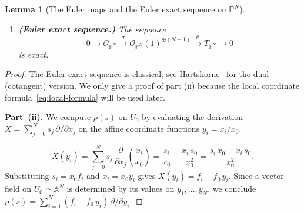 \documentclass[11pt,twoside]{amsart}
\theoremstyle{plain}
\numberwithin{equation}{section}
\newtheorem{lemma}[theorem]{Lemma}
\theoremstyle{definition}
\newcommand{\PP}{\mathbb{P}}
\newcommand{\OO}{\mathcal{O}}
\begin{document}
\begin{lemma}[The Euler maps and the Euler exact sequence on $\PP^N$]
\begin{enumerate}
\item[\textup{(iii)}] \textbf{(Euler exact sequence.)}
The sequence
\[
0\longrightarrow \OO_{\PP^N}
\xrightarrow{\ \sigma\ }
\OO_{\PP^N}(1)^{\oplus(N+1)}
\xrightarrow{\ \rho\ }
T_{\PP^N}
\longrightarrow 0
\]
is exact.
\end{enumerate}
\end{lemma}

\begin{proof}
The Euler exact sequence is classical; see Hartshorne~\cite[Theorem~II.8.13]{Hartshorne}
for the dual (cotangent) version.  We only give a proof of part (ii)  because the local coordinate formula~\eqref{eq:local-formula}
will be used later.


\noindent\textbf{Part~(ii).}
We compute $\rho(s)$ on $U_0$ by evaluating the derivation
$\widetilde{X}=\sum_{j=0}^N s_j\,\partial/\partial x_j$
on the affine coordinate functions $y_i=x_i/x_0$.

\[
\widetilde{X}(y_i)
=\sum_{j=0}^N s_j\,\frac{\partial}{\partial x_j}\!\left(\frac{x_i}{x_0}\right)
=\frac{s_i}{x_0}-\frac{x_i\, s_0}{x_0^2}
=\frac{s_i\, x_0-x_i\, s_0}{x_0^2}.
\]
Substituting $s_i=x_0 f_i$ and $x_i=x_0 y_i$ gives
$\widetilde{X}(y_i)=f_i-f_0\, y_i$.
Since a vector field on $U_0\simeq \mathbb{A}^N$ is determined by its values
on $y_1,\dots,y_N$, we conclude
$\rho(s)=\sum_{i=1}^N (f_i-f_0\, y_i)\,\partial/\partial y_i$.



\end{proof}
\end{document}

